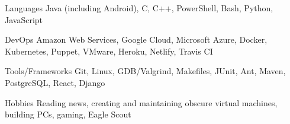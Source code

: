 

\begin{cvskills}


  \cvskill
    {Languages} %
    {Java (including Android), C, C++, PowerShell, Bash, Python, JavaScript} %

  \cvskill
    {DevOps} %
    {Amazon Web Services, Google Cloud, Microsoft Azure, Docker, Kubernetes, Puppet, VMware, Heroku, Netlify, Travis CI} %
    
  \cvskill
    {Tools/Frameworks} %
    {Git, Linux, GDB/Valgrind, Makefiles, JUnit, Ant, Maven, PostgreSQL, React, Django} %

  \cvskill
  {Hobbies} %
  {Reading news, creating and maintaining obscure virtual machines, building PCs, gaming, Eagle Scout} %

\end{cvskills}
